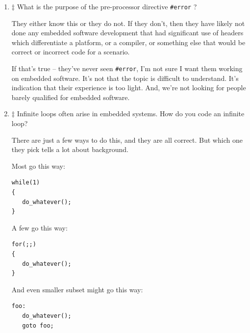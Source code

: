 \documentclass[12pt]{article}
\begin{document}
\begin{enumerate}
\par
So, they probably did OK and wrote a macro like that.. So let's dig deeper:

Comment on this code:
\begin{lstlisting}
int a;
int b;
int *pa = &a;
// ...
int r = MIN(*pa++, b);
\end{lstlisting}

There's a lot to unpack here.  Here's what the compiler sees:
\begin{lstlisting}
int r = (((*pa++) < (b)) ? (*pa++) : (b));
\end{lstlisting}

What is wrong with this scenario? Did they find the possibility that whatever {\texttt{pa}} is pointing to is incrementing
twice?  The side effects are bad.  Did they comment/find this problem?

\item $\ddagger$ What is the purpose of the pre-processor directive {\texttt{\#error}} ?

They either know this or they do not.  If they don't, then they have likely not done any embedded software
development that had significant use of headers which differentiate a platform, or a compiler, or something
else that would be correct or incorrect code for a scenario.

If that's true -- they've never seen {\texttt{\#error}}, I'm not sure I want them working on embedded software.
It's not that the topic is difficult to understand. It's indication that their experience is too light. And,
we're not looking for people barely qualified for embedded software.

\item $\ddagger$ Infinite loops often arise in embedded systems. How do you code an infinite loop?

There are just a few ways to do this, and they are all correct.  But which one they pick tells
a lot about background.

Most go this way:

\begin{lstlisting}
while(1)
{
   do_whatever();
}
\end{lstlisting}

A few go this way:
\begin{lstlisting}
for(;;) 
{
   do_whatever();
}
\end{lstlisting}

And even smaller subset might go this way:
\begin{lstlisting}
foo:
   do_whatever();
   goto foo;
\end{lstlisting}



\end{enumerate}
\end{document}
